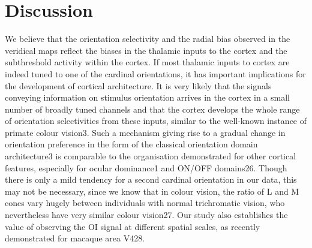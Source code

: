 	\section{Discussion}
	We believe that the orientation selectivity and the radial bias observed in the veridical maps
	reflect the biases in the thalamic inputs to the cortex and the subthreshold activity within the
	cortex. If most thalamic inputs to cortex are indeed tuned to one of the cardinal orientations, it
	has important implications for the development of cortical architecture. It is very likely that the
	signals conveying information on stimulus orientation arrives in the cortex in a small number of
	broadly tuned channels and that the cortex develops the whole range of orientation selectivities
	from these inputs, similar to the well-known instance of primate colour vision3. Such a
	mechanism giving rise to a gradual change in orientation preference in the form of the classical
	orientation domain architecture3 is comparable to the organisation demonstrated for other
	cortical features, especially for ocular dominance1 and ON/OFF domains26. Though there is only
	a mild tendency for a second cardinal orientation in our data, this may not be necessary, since we
	know that in colour vision, the ratio of L and M cones vary hugely between individuals with
	normal trichromatic vision, who nevertheless have very similar colour vision27. Our study also
	establishes the value of observing the OI signal at different spatial scales, as recently
	demonstrated for macaque area V428.